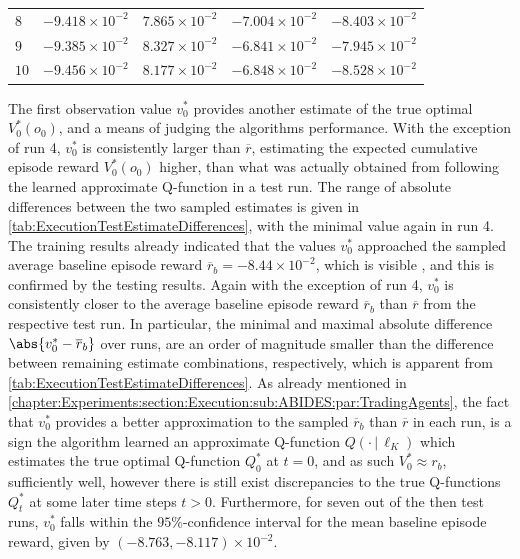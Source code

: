 \documentclass[
    a4paper,
    11pt,
    bibliography=totoc,
    listof=totoc,      
    headinclude=true,
    cleardoublepage=empty,
]{scrbook}
\theoremstyle{plain}
\theoremstyle{definition}
\theoremstyle{remark}
\begin{document}
\begin{table}[htpb!]
\begin{tabularx}{\textwidth}{ >{\centering}m{1.5cm} *{4}{C} }
        $ 8$ & $-9.418\times10^{-2}$ & $7.865\times10^{-2}$ 
            & $-7.004\times10^{-2}$ & $-8.403\times10^{-2}$ \\

        $ 9$ & $-9.385\times10^{-2}$ & $8.327\times10^{-2}$ 
            & $-6.841\times10^{-2}$ & $-7.945\times10^{-2}$ \\

        ${10}$ & $-9.456\times10^{-2}$ & $8.177\times10^{-2}$ 
            & $-6.848\times10^{-2}$ & $-8.528\times10^{-2}$ \\
    
        \bottomrule
    \end{tabularx}
\end{table}

The first observation value $v_0^*$ provides another estimate of the true 
optimal $V_0^*(o_0)$, and a means of judging the algorithms performance. 
With the exception of run 4, $v_0^*$ is consistently larger than $\overline r$, 
estimating the expected cumulative episode reward $V_0^*(o_0)$ higher, than 
what was actually obtained from following the learned approximate Q-function in 
a test run. The range of absolute differences between the two sampled estimates 
is given in \cref{tab:ExecutionTestEstimateDifferences}, with the minimal value again 
in run 4. The training results already indicated that the values $v_0^*$ 
approached the sampled average baseline episode reward $\overline r_b =
-8.44\times10^{-2}$, which is visible , and 
this is confirmed by the testing results. Again with the exception of run 4, 
$v_0^*$ is consistently closer to the average baseline episode reward 
$\overline r_b$ than $\overline r$ from the respective test run. In particular, 
the minimal and maximal absolute difference $\abs{v_0^* - \overline r_b}$ over 
runs, are an order of magnitude smaller than the difference between remaining 
estimate combinations, respectively, which is apparent from 
\cref{tab:ExecutionTestEstimateDifferences}. As already mentioned in 
\cref{chapter:Experiments:section:Execution:sub:ABIDES:par:TradingAgents}, the 
fact that $v_0^*$ provides a better approximation to the sampled $\overline 
r_b$ than $\overline r$ in each run, is a sign the algorithm learned an 
approximate Q-function $Q(\cdot\,|\,\ell_K)$ which estimates the true optimal 
Q-function $Q_0^*$ at $t=0$, and as such $V_0^* \approx r_b$, sufficiently 
well, however there is still exist discrepancies to the true Q-functions 
$Q_t^*$ at some later time steps $t>0$. Furthermore, for seven out of the then 
test runs, $v_0^*$ falls within the $95\%$-confidence interval for the mean 
baseline episode reward, given by $(-8.763, -8.117)\times 10^{-2}$. 
\end{document}
